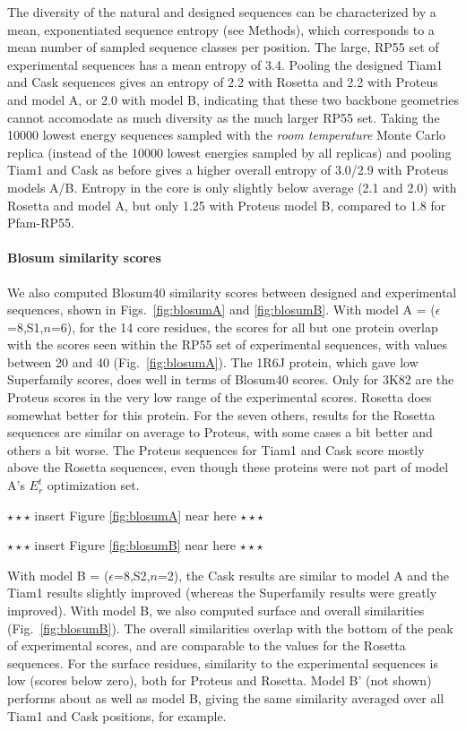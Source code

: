 \documentclass[12pt]{article}
\begin{document}
The diversity of the natural and designed sequences can be characterized by a mean, exponentiated sequence entropy (see Methods),
which corresponds to a mean number of sampled sequence classes per position. The large, RP55 set of experimental sequences has
a mean entropy of 3.4. Pooling the designed Tiam1 and Cask sequences gives an entropy of 2.2 with Rosetta and 2.2 with Proteus
and model A, or 2.0 with model B, indicating that these two backbone geometries cannot accomodate as much diversity as the much
larger RP55 set. Taking the 10000 lowest energy sequences sampled with the {\it room temperature} Monte Carlo replica (instead
of the 10000 lowest energies sampled by all replicas) and pooling Tiam1 and Cask as before gives a higher overall entropy of
3.0/2.9 with Proteus models A/B. Entropy in the core is only slightly below average (2.1 and 2.0) with Rosetta and model A, but
only 1.25 with Proteus model B, compared to 1.8 for Pfam-RP55. 

\paragraph{Blosum similarity scores}
We also computed Blosum40 similarity scores between designed and experimental sequences, shown in Figs.\ \ref{fig:blosumA}
and \ref{fig:blosumB}. With model A = ($\epsilon$=8,S1,$n$=6), for the 14 core residues, the scores for all but one protein
overlap with the scores seen within the RP55 set of experimental sequences, with values between 20 and 40 (Fig.\
\ref{fig:blosumA}). The 1R6J protein, which gave low Superfamily scores, does well in terms of Blosum40 scores. Only for 3K82
are the Proteus scores in the very low range of the experimental scores. Rosetta does somewhat better for this protein. For the
seven others, results for the Rosetta sequences are similar on average to Proteus, with some cases a bit better and others a
bit worse. The Proteus sequences for Tiam1 and Cask score mostly above the Rosetta sequences, even though these proteins were
not part of model A's $E_r^t$ optimization set. 
\begin{center} $\star \star \star$ insert Figure \ref{fig:blosumA} near here $\star \star \star$ \end{center}
\begin{center} $\star \star \star$ insert Figure \ref{fig:blosumB} near here $\star \star \star$ \end{center}

With model B = ($\epsilon$=8,S2,$n$=2), the Cask results are similar to model A and the Tiam1 results slightly improved (whereas
the Superfamily results were greatly improved). With model B, we also computed surface and overall similarities (Fig.\
\ref{fig:blosumB}). The overall similarities overlap with the bottom of the peak of experimental scores, and are comparable to the
values for the Rosetta sequences. For the surface residues, similarity to the experimental sequences is low (scores below zero),
both for Proteus and Rosetta. Model B' (not shown) performs about as well as model B, giving the same similarity averaged over
all Tiam1 and Cask positions, for example.
\end{document}
